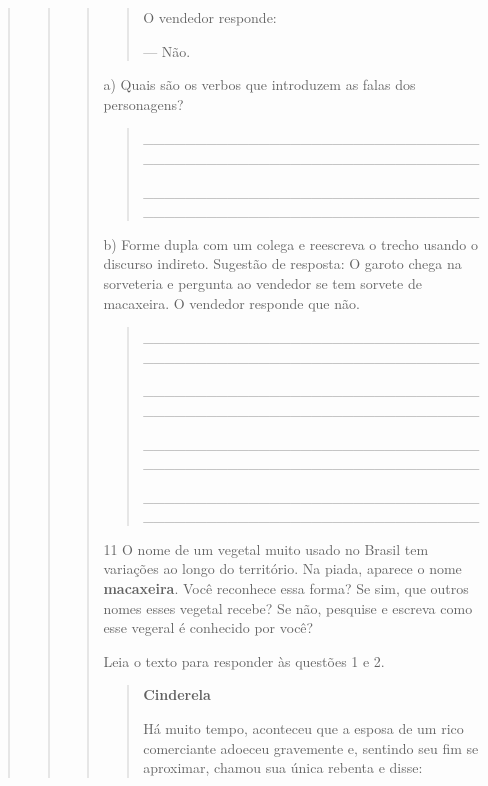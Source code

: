 \begin{boxlist}
{{\begin{quote}
\begin{quote}
\begin{quote}
{\begin{quote}
O vendedor responde:

--- Não.
\end{quote}

a) Quais são os verbos que introduzem as falas dos personagens? 


\begin{quote}
\_\_\_\_\_\_\_\_\_\_\_\_\_\_\_\_\_\_\_\_\_\_\_\_\_\_\_\_\_\_\_\_\_\_\_\_\_\_\_\_\_\_\_\_\_\_\_\_\_\_\_\_\_\_\_\_\_\_\_\_\_\_\_\_

\_\_\_\_\_\_\_\_\_\_\_\_\_\_\_\_\_\_\_\_\_\_\_\_\_\_\_\_\_\_\_\_\_\_\_\_\_\_\_\_\_\_\_\_\_\_\_\_\_\_\_\_\_\_\_\_\_\_\_\_\_\_\_\_
\end{quote}

b) Forme dupla com um colega e reescreva o trecho usando o discurso
indireto. Sugestão de resposta: O garoto chega na sorveteria e pergunta
ao vendedor se tem sorvete de macaxeira. O vendedor responde que não.

\begin{quote}
\_\_\_\_\_\_\_\_\_\_\_\_\_\_\_\_\_\_\_\_\_\_\_\_\_\_\_\_\_\_\_\_\_\_\_\_\_\_\_\_\_\_\_\_\_\_\_\_\_\_\_\_\_\_\_\_\_\_\_\_\_\_\_\_

\_\_\_\_\_\_\_\_\_\_\_\_\_\_\_\_\_\_\_\_\_\_\_\_\_\_\_\_\_\_\_\_\_\_\_\_\_\_\_\_\_\_\_\_\_\_\_\_\_\_\_\_\_\_\_\_\_\_\_\_\_\_\_\_

\_\_\_\_\_\_\_\_\_\_\_\_\_\_\_\_\_\_\_\_\_\_\_\_\_\_\_\_\_\_\_\_\_\_\_\_\_\_\_\_\_\_\_\_\_\_\_\_\_\_\_\_\_\_\_\_\_\_\_\_\_\_\_\_

\_\_\_\_\_\_\_\_\_\_\_\_\_\_\_\_\_\_\_\_\_\_\_\_\_\_\_\_\_\_\_\_\_\_\_\_\_\_\_\_\_\_\_\_\_\_\_\_\_\_\_\_\_\_\_\_\_\_\_\_\_\_\_\_
\end{quote}

\num{11} O nome de um vegetal muito usado no Brasil tem variações ao longo do território.
Na piada, aparece o nome \textbf{macaxeira}. Você reconhece essa forma? Se sim, que outros
nomes esses vegetal recebe? Se não, pesquise e escreva como esse vegeral é conhecido por
você?



Leia o texto para responder às questões 1 e 2.

\begin{quote}
\textbf{Cinderela}

Há muito tempo, aconteceu que a esposa de um rico
comerciante adoeceu gravemente e, sentindo seu fim se
aproximar, chamou sua única rebenta e disse:


\end{quote}}
\end{quote}
\end{quote}
\end{quote}}}
\end{boxlist}
